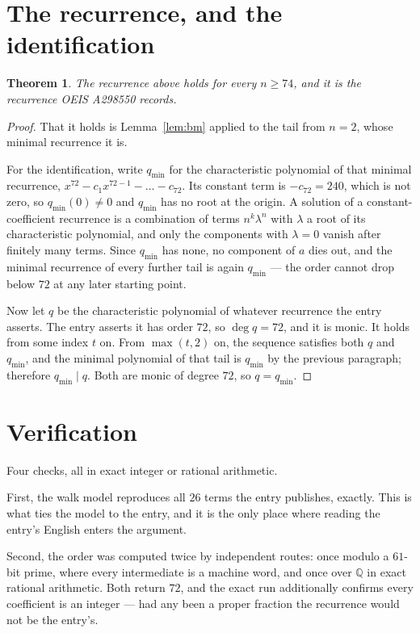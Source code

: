 \documentclass[11pt,a4paper]{article}
\theoremstyle{plain}
\newtheorem{theorem}{Theorem}
\theoremstyle{definition}
\begin{document}
\section{The recurrence, and the identification}

\begin{theorem}
The recurrence above holds for every $n\ge74$, and it is the recurrence OEIS A298550 records.
\end{theorem}

\begin{proof}
That it holds is Lemma~\ref{lem:bm} applied to the tail from $n=2$, whose minimal
recurrence it is.

For the identification, write $q_{\min}$ for the characteristic polynomial of that minimal
recurrence, $x^{72}-c_1x^{72-1}-\dots-c_{72}$. Its constant term is
$-c_{72}=240$, which is not zero, so $q_{\min}(0)\neq0$ and $q_{\min}$ has no
root at the origin. A solution of a constant-coefficient recurrence is a combination of terms
$n^{k}\lambda^{n}$ with $\lambda$ a root of its characteristic polynomial, and only the
components with $\lambda=0$ vanish after finitely many terms. Since $q_{\min}$ has none, no
component of $a$ dies out, and the minimal recurrence of every further tail is again
$q_{\min}$ --- the order cannot drop below $72$ at any later starting point.

Now let $q$ be the characteristic polynomial of whatever recurrence the entry asserts. The
entry asserts it has order $72$, so $\deg q=72$, and it is monic. It holds from some
index $t$ on. From $\max(t,2)$ on, the sequence satisfies both $q$ and $q_{\min}$, and
the minimal polynomial of that tail is $q_{\min}$ by the previous paragraph; therefore
$q_{\min}\mid q$. Both are monic of degree $72$, so $q=q_{\min}$.
\end{proof}

\section{Verification}

Four checks, all in exact integer or rational arithmetic.

First, the walk model reproduces all $26$ terms the entry publishes, exactly. This is
what ties the model to the entry, and it is the only place where reading the entry's English
enters the argument.

Second, the order was computed twice by independent routes: once modulo a $61$-bit prime, where
every intermediate is a machine word, and once over $\mathbb{Q}$ in exact rational arithmetic.
Both return $72$, and the exact run additionally confirms every coefficient is an integer
--- had any been a proper fraction the recurrence would not be the entry's.
\end{document}
